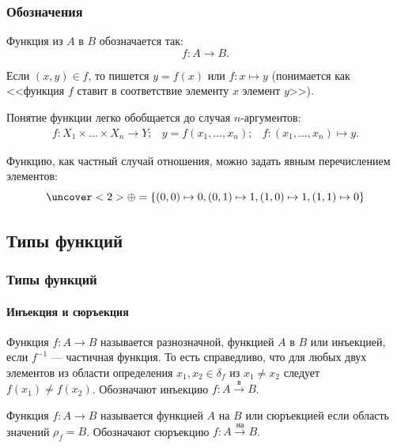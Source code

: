 \begin{frame}
    \frametitle{Обозначения}
    
    Функция из $A$ в $B$ обозначается так:
    \[f:A\to B.\]

    Если $(x,y)\in f$, то пишется $y=f(x)$ или $f:x\mapsto y$ (понимается как <<функция $f$ ставит в соответствие элементу $x$ элемент $y$>>).
    
    Понятие функции легко обобщается до случая $n$-аргументов:
    \[
        \begin{matrix}
        f:X_1\times \ldots \times X_n \to Y; &y = f(x_1,\ldots,x_n); &f:(x_1,\ldots,x_n)\mapsto y.
        \end{matrix}
    \]
    
    Функцию, как частный случай отношения, можно задать явным перечислением элементов:
    \[\uncover<2>{\oplus} = \{(0,0)\mapsto 0, (0,1)\mapsto 1, (1,0)\mapsto 1, (1,1)\mapsto 0\}\]
\end{frame}


\subsection{Типы функций}

\begin{frame}
    \frametitle{Типы функций}
    \framesubtitle{Инъекция и сюръекция}
    
    \begin{definition}
        Функция $f:A\to B$ называется \alert{разнозначной}, функцией $A$ в $B$ или \alert{инъекцией}, если $f^{-1}$ --- \alert{частичная} функция. То есть справедливо, что для любых двух элементов из области определения $x_1,x_2\in\delta_f$ из $x_1\neq x_2$ следует $f(x_1)\neq f(x_2)$. Обозначают инъекцию $f:A\xrightarrow{\text{в}} B$.
    \end{definition}

    \begin{definition}
        Функция $f:A\to B$ называется функцией $A$ на $B$ или \alert{сюръекцией} если область значений $\rho_f=B$. Обозначают сюръекцию $f:A\xrightarrow{\text{на}} B$.
    \end{definition}
\end{frame}

